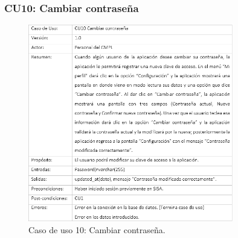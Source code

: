 		\subsubsection{CU10: Cambiar contraseña}
			\begin{figure}[htbp!]
				\centering
					\includegraphics[width=0.8\textwidth]{images/CU/CU10}
					\caption{Caso de uso 10: Cambiar contraseña.}
				\label{Tabla}
			\end{figure}
			
